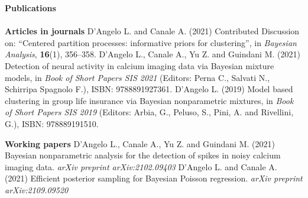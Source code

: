 \documentclass[10pt]{amsart}
\begin{document}
	{\large {\bf Publications}} \\[-.08cm] 
		\underline{\hspace{6in}} \\[.2cm] 
	{\bf Articles in journals}  \newline
	D'Angelo L. and Canale A. (2021) Contributed Discussion on: ``Centered partition processes: informative priors for clustering'', in \textit{Bayesian Analysis}, \textbf{16}(1), 356--358.
	\newline\newline
	D'Angelo L., Canale A., Yu Z. and Guindani M. (2021) Detection of neural activity in calcium imaging data via Bayesian mixture models, in \textit{Book of Short Papers SIS 2021} (Editors: Perna C., Salvati N., Schirripa Spagnolo F.), ISBN: 9788891927361.
	\newline\newline
	D'Angelo L. (2019) Model based clustering in group life insurance via Bayesian nonparametric mixtures, in \textit{Book of Short Papers SIS 2019} (Editors: Arbia, G., Peluso, S., Pini, A. and Rivellini, G.), ISBN: 978889191510.
	\newline\newline
	

	 
	{\bf Working papers}  \newline
	D'Angelo L., Canale A., Yu Z. and Guindani M. (2021) Bayesian nonparametric analysis for the detection of spikes in noisy calcium imaging data. \textit{arXiv preprint arXiv:2102.09403} 
	\newline\newline
	D’Angelo L. and Canale A. (2021) Efficient posterior sampling for Bayesian Poisson regression. \textit{arXiv preprint arXiv:2109.09520}
	\newline\newline
	
\end{document}
